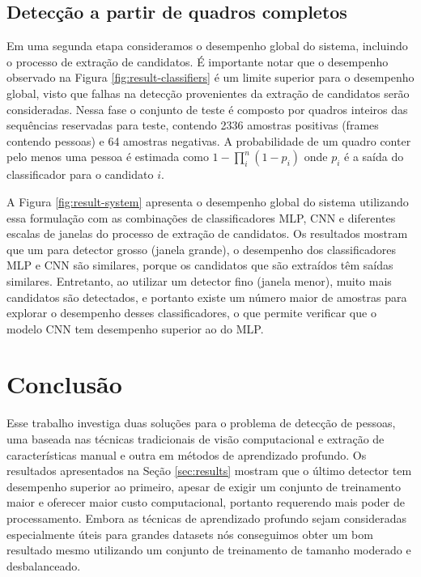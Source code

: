 \subsection{Detecção a partir de quadros completos}
    Em uma segunda etapa consideramos o desempenho global do sistema, incluindo o processo de extração de candidatos. É importante notar que o desempenho observado na Figura \ref{fig:result-classifiers} é um limite superior para o desempenho global, visto que falhas na detecção provenientes da extração de candidatos serão consideradas. Nessa fase o conjunto de teste é composto por quadros inteiros das sequências reservadas para teste, contendo 2336 amostras positivas (frames contendo pessoas) e 64 amostras negativas. A probabilidade de um quadro conter pelo menos uma pessoa é estimada como $1 - \prod_i^n (1-p_i)$ onde $p_i$ é a saída do classificador para o candidato $i$.

    A Figura \ref{fig:result-system} apresenta o desempenho global do sistema utilizando essa formulação com as combinações de classificadores MLP, CNN e diferentes escalas de janelas do processo de extração de candidatos. Os resultados mostram que um para detector grosso (janela grande), o desempenho dos classificadores MLP e CNN são similares, porque os candidatos que são extraídos têm saídas similares. Entretanto, ao utilizar um detector fino (janela menor), muito mais candidatos são detectados, e portanto existe um número maior de amostras para explorar o desempenho desses classificadores, o que permite verificar que o modelo CNN tem desempenho superior ao do MLP.

    \begin{figure*}[!t]
    \centering
    \label{fig:result-system-all}
    \hfil
    \label{fig:result-system-all-zoom}
    \caption{Desempenho global do sistema.}
    \label{fig:result-system}
    \end{figure*}

\section{Conclusão}
\label{sec:conclusion}

    Esse trabalho investiga duas soluções para o problema de detecção de pessoas, uma baseada nas técnicas tradicionais de visão computacional e extração de características manual e outra em métodos de aprendizado profundo. Os resultados apresentados na Seção \ref{sec:results} mostram que o último detector tem desempenho superior ao primeiro, apesar de exigir um conjunto de treinamento maior e oferecer maior custo computacional, portanto requerendo mais poder de processamento. Embora as técnicas de aprendizado profundo sejam consideradas especialmente úteis para grandes datasets nós conseguimos obter um bom resultado mesmo utilizando um conjunto de treinamento de tamanho moderado e desbalanceado.

